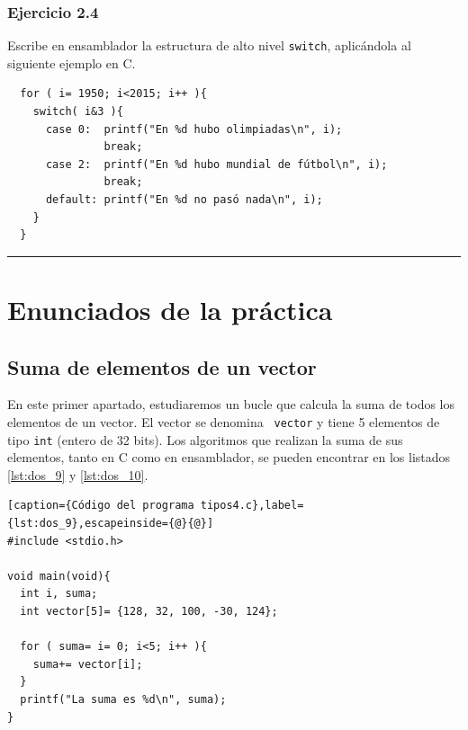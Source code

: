 \subsubsection{Ejercicio 2.4}

Escribe en ensamblador la estructura de alto nivel {\tt switch},
aplicándola al siguiente ejemplo en C.

\begin{center}
\begin{myfbox}
\small
\begin{minipage}{0.92\linewidth}
\begin{minipage}{0.6\linewidth}
\begin{verbatim}
  for ( i= 1950; i<2015; i++ ){
    switch( i&3 ){
      case 0:  printf("En %d hubo olimpiadas\n", i);
               break;
      case 2:  printf("En %d hubo mundial de fútbol\n", i);
               break;
      default: printf("En %d no pasó nada\n", i);
    }
  }
\end{verbatim}
\end{minipage}
\begin{center}
\colorbox[gray]{1}{\rule{0cm}{7cm}\rule{11cm}{0cm}}
\end{center}
\end{minipage}
\end{myfbox}
\end{center}

\section{Enunciados de la práctica}


\subsection{Suma de elementos de un vector}

En este primer apartado, estudiaremos un bucle que calcula la suma de
todos los elementos de un vector. El vector se denomina {\tt
vector} y tiene 5 elementos de tipo {\tt int} (entero de 32 bits). Los algoritmos
que realizan la suma de sus elementos, tanto en C como en ensamblador, se
pueden encontrar en los listados \ref{lst:dos_9} y \ref{lst:dos_10}.

\begin{lstlisting}[caption={Código del programa tipos4.c},label={lst:dos_9},escapeinside={@}{@}]
#include <stdio.h>

void main(void){
  int i, suma;
  int vector[5]= {128, 32, 100, -30, 124};

  for ( suma= i= 0; i<5; i++ ){
    suma+= vector[i];
  }
  printf("La suma es %d\n", suma);
}
\end{lstlisting}

